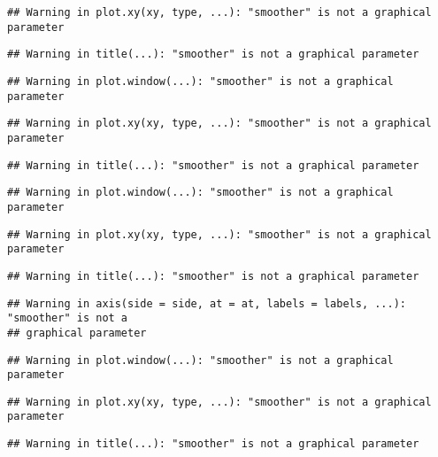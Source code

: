 \documentclass[
]{article}
\begin{document}
\begin{verbatim}
## Warning in plot.xy(xy, type, ...): "smoother" is not a graphical parameter
\end{verbatim}

\begin{verbatim}
## Warning in title(...): "smoother" is not a graphical parameter
\end{verbatim}

\begin{verbatim}
## Warning in plot.window(...): "smoother" is not a graphical parameter
\end{verbatim}

\begin{verbatim}
## Warning in plot.xy(xy, type, ...): "smoother" is not a graphical parameter
\end{verbatim}

\begin{verbatim}
## Warning in title(...): "smoother" is not a graphical parameter
\end{verbatim}

\begin{verbatim}
## Warning in plot.window(...): "smoother" is not a graphical parameter
\end{verbatim}

\begin{verbatim}
## Warning in plot.xy(xy, type, ...): "smoother" is not a graphical parameter
\end{verbatim}

\begin{verbatim}
## Warning in title(...): "smoother" is not a graphical parameter
\end{verbatim}

\begin{verbatim}
## Warning in axis(side = side, at = at, labels = labels, ...): "smoother" is not a
## graphical parameter
\end{verbatim}

\begin{verbatim}
## Warning in plot.window(...): "smoother" is not a graphical parameter
\end{verbatim}

\begin{verbatim}
## Warning in plot.xy(xy, type, ...): "smoother" is not a graphical parameter
\end{verbatim}

\begin{verbatim}
## Warning in title(...): "smoother" is not a graphical parameter
\end{verbatim}
\end{document}
